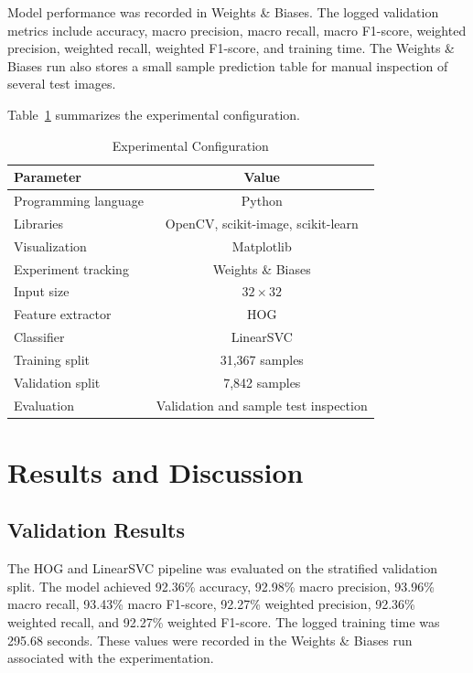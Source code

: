 \documentclass[conference]{IEEEtran}
\begin{document}
Model performance was recorded in Weights \& Biases. The logged validation metrics include accuracy, macro precision, macro recall, macro F1-score, weighted precision, weighted recall, weighted F1-score, and training time. The Weights \& Biases run also stores a small sample prediction table for manual inspection of several test images.

Table~\ref{tab:experiment} summarizes the experimental configuration.

\begin{table}[htbp]
\caption{Experimental Configuration}
\label{tab:experiment}
\centering
\begin{tabular}{lc}
\toprule
Parameter & Value\\
\midrule
Programming language & Python\\
Libraries & OpenCV, scikit-image, scikit-learn\\
Visualization & Matplotlib\\
Experiment tracking & Weights \& Biases\\
Input size & $32 \times 32$\\
Feature extractor & HOG\\
Classifier & LinearSVC\\
Training split & 31,367 samples\\
Validation split & 7,842 samples\\
Evaluation & Validation and sample test inspection\\
\bottomrule
\end{tabular}
\end{table}

\section{Results and Discussion}
\label{sec:results}

\subsection{Validation Results}

The HOG and LinearSVC pipeline was evaluated on the stratified validation split. The model achieved 92.36\% accuracy, 92.98\% macro precision, 93.96\% macro recall, 93.43\% macro F1-score, 92.27\% weighted precision, 92.36\% weighted recall, and 92.27\% weighted F1-score. The logged training time was 295.68 seconds. These values were recorded in the Weights \& Biases run associated with the experimentation.
\end{document}
